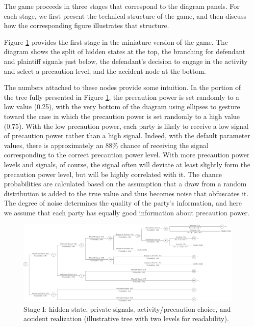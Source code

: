 \documentclass{article}
\begin{document}
The game proceeds in three stages that correspond to the diagram panels. For each stage, we first present the technical structure of the game, and then discuss how the corresponding figure illustrates that structure. 

Figure \ref{fig:smalltree_beginning.pdf} provides the first stage in the miniature version of the game. The diagram shows the split of hidden states at the top, the branching for defendant and plaintiff signals just below, the defendant’s decision to engage in the activity and select a precaution level, and the accident node at the bottom. 

The numbers attached to these nodes provide some intuition. In the portion of the tree fully presented in Figure \ref{fig:smalltree_beginning.pdf}, the precaution power is set randomly to a low value (0.25), with the very bottom of the diagram using ellipses to gesture toward the case in which the precaution power is set randomly to a high value (0.75). With the low precaution power, each party is likely to receive a low signal of precaution power rather than a high signal. Indeed, with the default parameter values, there is approximately an 88\% chance of receiving the signal corresponding to the correct precaution power level. With more precaution power levels and signals, of course, the signal often will deviate at least slightly form the precaution power level, but will be highly correlated with it. The chance probabilities are calculated based on the assumption that a draw from a random distribution is added to the true value and thus becomes noise that obfuscates it. The degree of noise determines the quality of the party's information, and here we assume that each party has equally good information about precaution power.

  \begin{figure}[t]
    \centering
    \includegraphics[width=\textwidth]{../Figures/smalltree_beginning.pdf}
    \caption{Stage I: hidden state, private signals, activity/precaution choice, and accident realization (illustrative tree with two levels for readability).}
    \label{fig:smalltree_beginning.pdf}
  \end{figure}
\end{document}
